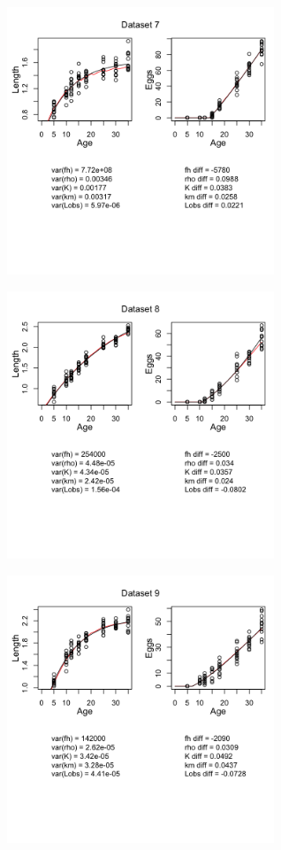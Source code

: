 \documentclass[12pt,reqno,final,pdftex]{amsart}\usepackage[]{graphicx}\usepackage[]{color}
\newenvironment{knitrout}{}{} %
\theoremstyle{plain}
\numberwithin{equation}{part}
\begin{document}
\begin{knitrout}
\includegraphics[width=0.6\textwidth]{figure/unnamed-chunk-5-7} \hfill{}




\includegraphics[width=0.6\textwidth]{figure/unnamed-chunk-5-8} \hfill{}




\includegraphics[width=0.6\textwidth]{figure/unnamed-chunk-5-9} \hfill{}





\end{knitrout}
\end{document}
